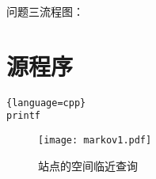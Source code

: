 \documentclass[bwprint]{cumcmthesis}    %
\begin{document}
问题三流程图：
\appendix

\section{源程序}

\begin{lstlisting}{language=cpp}
printf
\end{lstlisting}


\begin{figure}
\centering
\texttt{[image: markov1.pdf]}
\caption{站点的空间临近查询}
\label{sitetarget}
\end{figure}
\end{document}

